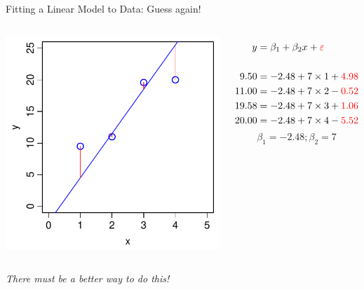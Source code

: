 \documentclass[xcolor=x11names,handout,compress]{beamer}
\renewcommand{\(}{\begin{columns}}
\renewcommand{\)}{\end{columns}}
\newcommand{\<}[1]{\begin{column}{#1}}
\renewcommand{\>}{\end{column}}
\begin{document}

\begin{frame}{Fitting a Linear Model to Data: Guess again!}
    \begin{columns}[T]

		\includegraphics[width=\textwidth]{TooSteep.pdf}
		
		\begin{align*}
		  y  &= \beta_1 + \beta_2 x + {\color{red} \varepsilon }\\
		  \\
		  9.50  &= -2.48 + 7 \times 1 + {\color{red} 4.98}\\
		  11.00 &= -2.48 + 7 \times 2 - {\color{red} 0.52}\\
		  19.58 &= -2.48 + 7 \times 3 + {\color{red} 1.06}\\
		  20.00 &= -2.48 + 7 \times 4 - {\color{red} 5.52} 
		\end{align*}
		\[\beta_1 = -2.48; \beta_2=7\]

\end{columns}		
\pause
\begin{center}
    {\it There must be a better way to do this!}
\end{center}

\end{frame}
\end{document}
